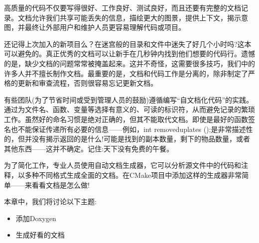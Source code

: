 高质量的代码不仅要写得很好、工作良好、测试良好，而且还要有完整的文档记录。文档允许我们共享可能丢失的信息，描绘更大的图景，提供上下文，揭示意图，并最终让外部用户和维护人员更容易理解代码或项目。

还记得上次加入的新项目么？在迷宫般的目录和文件中迷失了好几个小时吗?这本可以避免的。真正优秀的文档可以让新手在几秒钟内找到他们想要的代码行。遗憾的是，缺少文档的问题常常被掩盖起来。这并不奇怪，这需要很多技巧，我们中的许多人并不擅长制作文档。最重要的是，文档和代码工作是分离的，除非制定了严格的更新和审查流程，否则很容易忘记更新文档。

有些团队(为了节省时间或受到管理人员的鼓励)遵循编写“自文档化代码”的实践。通过为文件名、函数、变量等选择有意义的、可读的标识符，从而避免记录的繁琐工作。虽然好的命名习惯是绝对正确的，但其不能取代文档。即使是最好的函数签名也不能保证传递所有必要的信息——例如，int removeduplates ();是非常描述性的，但并没有揭示返回的是什么!可能是找到的副本数量，剩下的物品数量，或者其他东西——这并不确定。记住:天下没有免费的午餐。

为了简化工作，专业人员使用自动文档生成器，它可以分析源文件中的代码和注释，以多种不同格式生成全面的文档。在CMake项目中添加这样的生成器非常简单——来看看文档是怎么做!

本章中，我们将讨论以下主题:

\begin{itemize}
\item 
添加Doxygen

\item 
生成好看的文档
\end{itemize}
